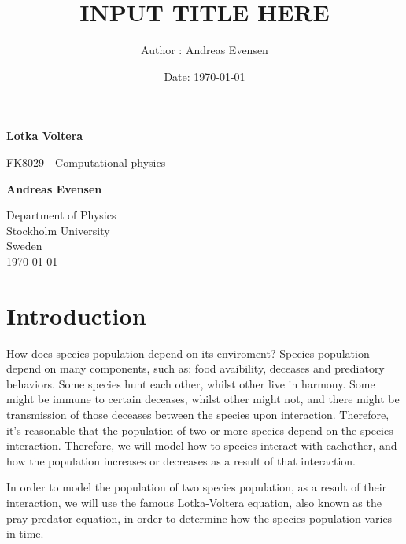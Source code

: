 \documentclass[a4paper]{article}
\title{INPUT TITLE HERE}
\author{Author : Andreas Evensen}
\date{Date: \today}
\newcommand{\newparagraph}{\vspace{.5cm}\noindent}
\begin{document}
\begin{titlepage}
    \begin{center}
        \vspace*{1cm}

        \Huge
        \textbf{Lotka Voltera}

        \vspace{0.5cm}
        \LARGE
        FK8029 - Computational physics

        \vspace{1.5cm}

        \textbf{Andreas Evensen}

        \vfill


        \Large
        Department of Physics\\
        Stockholm University\\
        Sweden\\
        \today
    \end{center}
\end{titlepage}


\section{Introduction}
How does species population depend on its enviroment? Species population depend on many components, such as: food avaibility, deceases and prediatory behaviors. Some species hunt each other, whilst other live in harmony. Some might be immune to certain deceases, whilst other might not, and there might be transmission of those deceases between the species upon interaction. Therefore, it's reasonable that the population of two or more species depend on the species interaction. Therefore, we will model how to species interact with eachother, and how the population increases or decreases as a result of that interaction.

\newparagraph
In order to model the population of two species population, as a result of their interaction, we will use the famous Lotka-Voltera equation, also known as the pray-predator equation, in order to determine how the species population varies in time.
\newpage

\tableofcontents
\newpage
\end{document}
